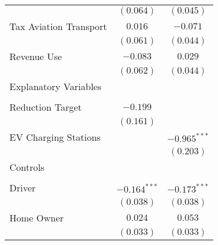 \begin{center}
\begin{tiny}
\begin{longtable}{l@{} c@{} c@{}}
                                                                            & $(0.064)$        & $(0.045)$        \\
\quad Tax Aviation Transport                                                & $0.016$          & $-0.071$         \\
                                                                            & $(0.061)$        & $(0.044)$        \\
\quad Revenue Use                                                           & $-0.083$         & $0.029$          \\
                                                                            & $(0.062)$        & $(0.044)$        \\
Explanatory Variables                                                       &                  &                  \\
                                                                            &                  &                  \\
\quad Reduction Target                                                      & $-0.199$         &                  \\
                                                                            & $(0.161)$        &                  \\
\quad EV Charging Stations                                                  &                  & $-0.965^{***}$   \\
                                                                            &                  & $(0.203)$        \\
Controls                                                                    &                  &                  \\
                                                                            &                  &                  \\
\quad Driver                                                                & $-0.164^{***}$   & $-0.173^{***}$   \\
                                                                            & $(0.038)$        & $(0.038)$        \\
\quad Home Owner                                                            & $0.024$          & $0.053$          \\
                                                                            & $(0.033)$        & $(0.033)$        \\

\end{longtable}
\end{tiny}
\end{center}

